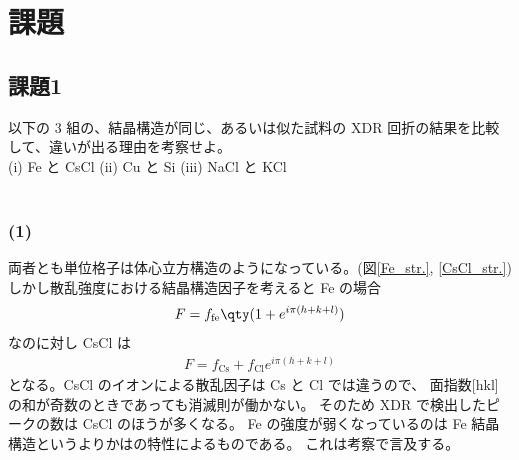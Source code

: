 \documentclass[11pt,dvipdfmx,a4paper]{jsarticle}
\begin{document}

\section{課題}
\subsection*{課題1}
以下の 3 組の、結晶構造が同じ、あるいは似た試料の XDR 回折の結果を比較して、違いが出る理由を考察せよ。\\
(i) Fe と CsCl \quad (ii) Cu と Si \quad (iii) NaCl と KCl\\ \\

\subsubsection*{(1)}
両者とも単位格子は体心立方構造のようになっている。(図\ref{Fe_str.}, \ref{CsCl_str.})
しかし散乱強度における結晶構造因子を考えると Fe の場合
\begin{align}
	F = f_{\text{fe}}\qty(1+e^{i\pi(h+k+l)})
\end{align}
なのに対し CsCl は
\begin{align}
	F = f_{\text{Cs}}+f_{\text{Cl}}e^{i\pi(h+k+l)}
\end{align}
となる。CsCl のイオンによる散乱因子は Cs と Cl では違うので、
面指数[hkl] の和が奇数のときであっても消滅則が働かない。
そのため XDR で検出したピークの数は CsCl のほうが多くなる。%
Fe の強度が弱くなっているのは Fe 結晶構造というよりかはの特性によるものである。
これは考察で言及する。\\ %
\end{document}
